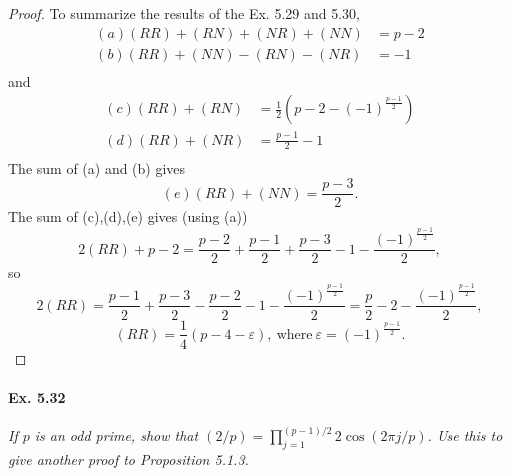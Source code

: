 \documentclass[11pt,a4paper]{article}
\begin{document}
\begin{proof}
To summarize the results of the Ex. 5.29 and 5.30,
\begin{align*}
(a) (RR) +(RN) + (NR)+ (NN) &=  p-2\\
(b) (RR) + (NN) - (RN) - (NR)  &= -1\\
\end{align*}
and
\begin{align*}
(c)(RR)+(RN) &=\frac{1}{2}\left(p - 2 - (-1)^{\frac{p-1}{2}}\right)\\
(d)(RR)+(NR) &= \frac{p-1}{2} - 1\\
\end{align*}
The sum of (a) and (b) gives
$$(e) (RR) + (NN) = \frac{p-3}{2}.$$
The sum of (c),(d),(e) gives (using (a))
$$2(RR) + p-2 = \frac{p-2}{2} + \frac{p-1}{2} + \frac{p-3}{2} - 1 - \frac{(-1)^{\frac{p-1}{2}}}{2},$$
so
$$2 (RR) = \frac{p-1}{2} + \frac{p-3}{2} - \frac{p-2}{2} - 1 - \frac{(-1)^{\frac{p-1}{2}}}{2} = \frac{p}{2} - 2 - \frac{(-1)^{\frac{p-1}{2}}}{2},$$
$$(RR) = \frac{1}{4} (p-4-\varepsilon),\ \mathrm{where} \ \varepsilon = (-1)^{\frac{p-1}{2}}.$$
\end{proof}

\paragraph{Ex. 5.32}

{\it If $p$ is an odd prime, show that $(2/p) = \prod_{j=1}^{(p-1)/2} 2\cos(2 \pi j/p)$. Use this to give another proof to Proposition 5.1.3.
}
\end{document}

